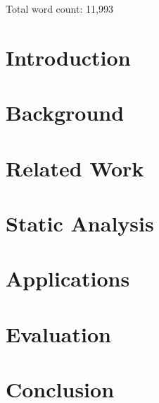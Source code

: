 \documentclass[12pt,a4paper,twoside,openright,notitlepage]{report}
\begin{document}

% 

% 

\thispagestyle{plain}



\clearpage

\thispagestyle{plain}

Total word count: 11,993

\clearpage


\tableofcontents

\clearpage


\chapter{Introduction}



\chapter{Background}



\chapter{Related Work}



\chapter{Static Analysis}



\chapter{Applications}



\chapter{Evaluation}



\chapter{Conclusion}



\printbibliography
\end{document}
